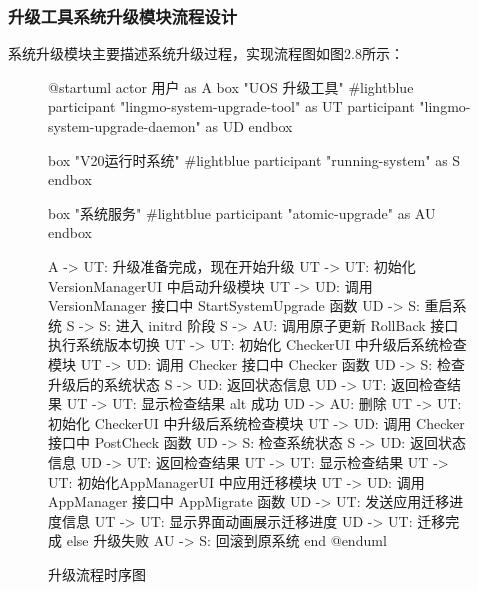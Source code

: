 \documentclass{utart}
\begin{document}
\subsubsection{升级工具系统升级模块流程设计}
系统升级模块主要描述系统升级过程，实现流程图如图2.8所示：
\begin{figure}[H]
    \centering
    \begin{plantuml}
        @startuml
        actor 用户 as A 
        box "UOS 升级工具" #lightblue
        participant "lingmo-system-upgrade-tool" as UT
        participant "lingmo-system-upgrade-daemon" as UD                             
        endbox

        box "V20运行时系统" #lightblue
        participant "running-system" as S
        endbox

        box "系统服务" #lightblue 
        participant "atomic-upgrade" as AU
        endbox

        A -> UT: 升级准备完成，现在开始升级
        UT -> UT: 初始化 VersionManagerUI 中启动升级模块
        UT -> UD: 调用 VersionManager 接口中 StartSystemUpgrade 函数
        UD -> S: 重启系统
        S -> S: 进入 initrd 阶段
        S -> AU: 调用原子更新 RollBack 接口执行系统版本切换
        UT -> UT: 初始化 CheckerUI 中升级后系统检查模块
        UT -> UD: 调用 Checker 接口中 Checker 函数
        UD -> S: 检查升级后的系统状态
        S -> UD: 返回状态信息
        UD -> UT: 返回检查结果
        UT -> UT: 显示检查结果
        alt 成功
        UD -> AU: 删除
        UT -> UT: 初始化 CheckerUI 中升级后系统检查模块
        UT -> UD: 调用 Checker 接口中 PostCheck 函数
        UD -> S: 检查系统状态
        S -> UD: 返回状态信息
        UD -> UT: 返回检查结果
        UT -> UT: 显示检查结果
        UT -> UT: 初始化AppManagerUI 中应用迁移模块
        UT -> UD: 调用AppManager 接口中 AppMigrate 函数
        UD -> UT: 发送应用迁移进度信息
        UT -> UT: 显示界面动画展示迁移进度
        UD -> UT: 迁移完成
        else 升级失败
        AU -> S: 回滚到原系统
        end
        @enduml
    \end{plantuml}
    \caption{升级流程时序图}
    \label{fig:upgrade}
\end{figure}
\end{document}
